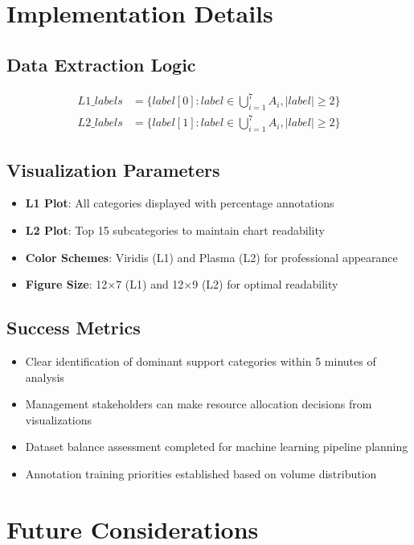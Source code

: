 \documentclass[11pt]{article}
\begin{document}
\section{Implementation Details}

\subsection{Data Extraction Logic}
\begin{align}
L1\_labels &= \{label[0] : label \in \bigcup_{i=1}^{7} A_i, |label| \geq 2\} \\
L2\_labels &= \{label[1] : label \in \bigcup_{i=1}^{7} A_i, |label| \geq 2\}
\end{align}

\subsection{Visualization Parameters}
\begin{itemize}
\item \textbf{L1 Plot}: All categories displayed with percentage annotations
\item \textbf{L2 Plot}: Top 15 subcategories to maintain chart readability
\item \textbf{Color Schemes}: Viridis (L1) and Plasma (L2) for professional appearance
\item \textbf{Figure Size}: 12×7 (L1) and 12×9 (L2) for optimal readability
\end{itemize}

\subsection{Success Metrics}
\begin{itemize}
\item Clear identification of dominant support categories within 5 minutes of analysis
\item Management stakeholders can make resource allocation decisions from visualizations
\item Dataset balance assessment completed for machine learning pipeline planning
\item Annotation training priorities established based on volume distribution
\end{itemize}

\section{Future Considerations}
\end{document}

